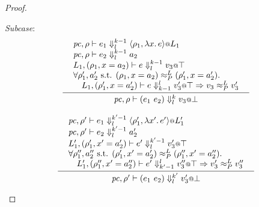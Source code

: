 \documentclass{article}
\makeatletter
\theoremstyle{definition}
\newcommand{\at}{\ensuremath{{\scriptstyle{@}}}}
\newcommand{\pc}{\ensuremath{{\mathit{pc}}}}
\makeatother
\begin{document}
\begin{proof}
\begin{description}
    \emph{Subcase}:
    \begin{gather*}
      \inference{
        {\begin{array}{l}
            \pc, \rho |- e_1 \Downarrow^{k-1}_{l}
            \langle{\rho_1, \lambda{x}.\, e\rangle} \at L_1
            \\
            \pc, \rho |- e_2 \Downarrow^{k-1}_{l} a_2
            \\
            L_1, (\rho_1, x = a_2) |- e \Downarrow^{k-1}_{l} v_3 \at \top
            \\
            \forall{\rho_1', a_2' \text{ s.t. }
              (\rho_1, x = a_2) \approx^{L}_{P} (\rho_1', x = a_2')}.
            \\\quad
            L_1, (\rho_1', x = a_2') |- e \Downarrow^{l}_{k-1} v_3' \at \top =>
            v_3 \approx^{L}_{P} v_3'
          \end{array}}
      }{
        \pc, \rho |- (e_1\ e_2) \Downarrow^{k}_{l} v_3 \at \bot
      }
      \\[2ex]
      \inference{
        {\begin{array}{l}
            \pc, \rho' |- e_1 \Downarrow^{k'-1}_{l}
            \langle{\rho_1', \lambda{x'}.\, e'\rangle} \at L_1'
            \\
            \pc, \rho' |- e_2 \Downarrow^{k'-1}_{l} a_2'
            \\
            L_1', (\rho_1', x' = a_2') |- e' \Downarrow^{k'-1}_{l} v_3' \at \top
            \\
            \forall{\rho_1'', a_2'' \text{ s.t. }
              (\rho_1', x' = a_2') \approx^{L}_{P} (\rho_1'', x' = a_2'')}.
            \\\quad
            L_1', (\rho_1'', x' = a_2'') |- e' \Downarrow^{l}_{k'-1}
            v_3'' \at \top =>
            v_3' \approx^{L}_{P} v_3''
          \end{array}}
      }{
        \pc, \rho' |- (e_1\ e_2) \Downarrow^{k'}_{l} v_3' \at \bot
      }
    \end{gather*}
    
  \end{description}
\end{proof}
\end{document}
